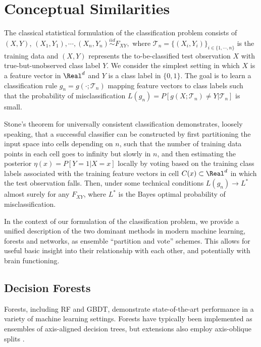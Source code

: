 
\section{Conceptual Similarities}
The classical statistical formulation of the classification problem consists of $(X,Y)$, $(X_1,Y_1), \cdots, (X_n,Y_n) \stackrel{iid}{\sim} F_{XY},$ where $\mathcal{T}_n = \{(X_i,Y_i)\}_{i \in \{1,\cdots,n\}}$ is the training data and $(X,Y)$ represents the to-be-classified test observation $X$ with true-but-unobserved class label $Y$. We consider the simplest setting in which $X$ is a feature vector in $\Real^d$ and $Y$ is a class label in $\{0,1\}$. The goal is to learn a classification rule $g_n = g(\cdot;\mathcal{T}_n)$ mapping feature vectors to class labels such that the probability of misclassification $L(g_n) = P[g(X;\mathcal{T}_n) \neq Y|\mathcal{T}_n]$ is small.

Stone's theorem for universally consistent classification \citep{Stone1977, DGL} demonstrates, loosely speaking, that a successful classifier can be constructed by first partitioning the input space into cells depending on $n$, such that the number of training data points in each cell goes to infinity but slowly in $n$, and then estimating the posterior 
$\eta(x) = P[Y=1|X=x]$ locally by voting based on the training class labels associated with the training feature vectors in cell $C(x) \subset \Real^d$ in which the test observation falls.
Then, under some technical conditions $L(g_n) \to L^*$ almost surely for any $F_{XY}$, where $L^*$ is the Bayes optimal probability of misclassification.

In the context of our formulation of the classification problem,
we provide a unified description of the two dominant methods in modern machine learning, forests and networks, as ensemble ``partition and vote'' schemes.
This allows for useful basic insight into their relationship with each other, and potentially with brain functioning.

\subsection{Decision Forests}
Forests, including RF and GBDT, demonstrate state-of-the-art performance in a variety of machine learning settings.
Forests have typically been implemented as ensembles of axis-aligned decision trees, but extensions also employ axis-oblique splits \citep{Amit1997, Breiman2001, Tomita2017-mv, sporf}.

